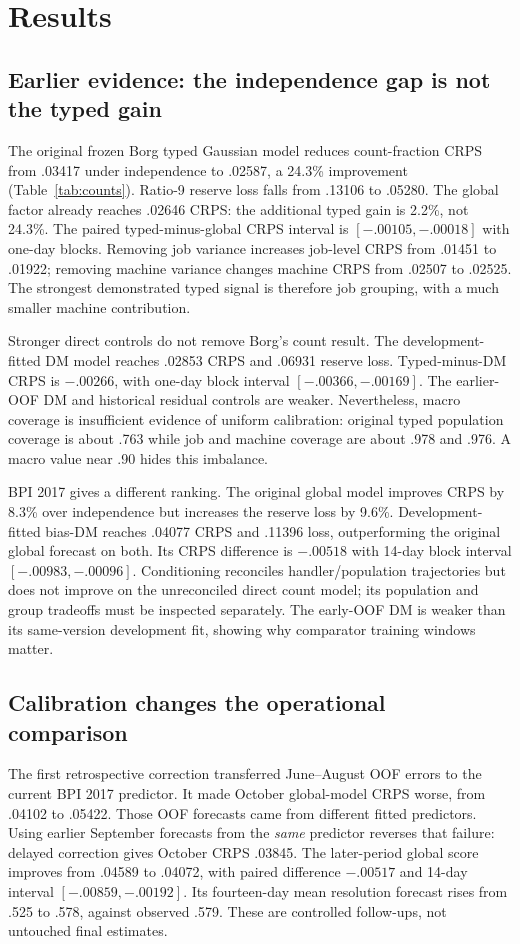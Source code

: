 \section{Results}



\subsection{Earlier evidence: the independence gap is not the typed gain}
The original frozen Borg typed Gaussian model reduces count-fraction CRPS
from .03417 under independence to .02587, a 24.3\% improvement
(Table~\ref{tab:counts}). Ratio-9 reserve loss falls from .13106 to .05280.
The global factor already reaches .02646 CRPS: the additional typed gain is
2.2\%, not 24.3\%. The paired typed-minus-global CRPS interval is
$[-.00105,-.00018]$ with one-day blocks. Removing job variance increases
job-level CRPS from .01451 to .01922; removing machine variance changes
machine CRPS from .02507 to .02525. The strongest demonstrated typed signal
is therefore job grouping, with a much smaller machine contribution.

Stronger direct controls do not remove Borg's count result. The
development-fitted DM model reaches .02853 CRPS and .06931 reserve loss.
Typed-minus-DM CRPS is $-.00266$, with one-day block interval
$[-.00366,-.00169]$. The earlier-OOF DM and historical residual controls are
weaker. Nevertheless, macro coverage is insufficient evidence of uniform
calibration: original typed population coverage is about .763 while job and
machine coverage are about .978 and .976. A macro value near .90 hides this
imbalance.

BPI 2017 gives a different ranking. The original global model improves CRPS
by 8.3\% over independence but increases the reserve loss by 9.6\%.
Development-fitted bias-DM reaches .04077 CRPS and .11396 loss, outperforming
the original global forecast on both. Its CRPS difference is $-.00518$
with 14-day block interval $[-.00983,-.00096]$. Conditioning reconciles
handler/population trajectories but does not improve on the unreconciled
direct count model; its population and group tradeoffs must be inspected
separately. The early-OOF DM is weaker than its same-version development fit,
showing why comparator training windows matter.

\subsection{Calibration changes the operational comparison}
The first retrospective correction transferred June--August OOF errors to
the current BPI 2017 predictor. It made October global-model CRPS worse,
from .04102 to .05422. Those OOF forecasts came from different fitted
predictors. Using earlier September forecasts from the \emph{same} predictor
reverses that failure: delayed correction gives October CRPS .03845.
The later-period global score improves from .04589 to .04072, with paired
difference $-.00517$ and 14-day interval $[-.00859,-.00192]$.
Its fourteen-day mean resolution forecast rises from .525 to .578, against
observed .579. These are controlled follow-ups, not untouched final estimates.

